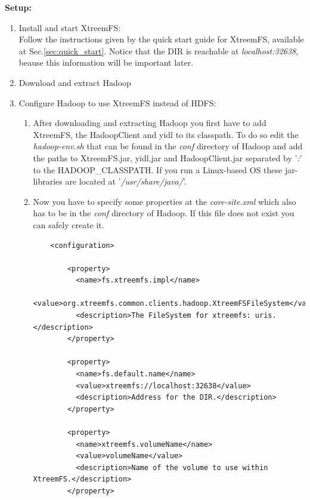\documentclass[a4paper,10pt]{book}
\begin{document}
\textbf{Setup:}
\begin{enumerate}
 \item Install and start XtreemFS:\\
	Follow the instructions given by the quick start guide for XtreemFS, available at Sec.\ref{sec:quick_start}. Notice 	
	that the DIR is reachable at \textit{localhost:32638}, beause this information will be important later.

\item Download and extract Hadoop

\item Configure Hadoop to use XtreemFS instead of HDFS:
	\begin{enumerate}
	\item After downloading and extracting Hadoop you first have to add XtreemFS, the HadoopClient and yidl to its 
	classpath. To do so edit the \textit{hadoop-env.sh} that can be found in the \textit{conf} directory of Hadoop and 
	add the paths to XtreemFS.jar, yidl.jar and HadoopClient.jar separated by '\textit{:}' to the HADOOP\_CLASSPATH. 
	If you run a Linux-based OS these jar-libraries are located at '\textit{/usr/share/java/}'.
	\item Now you have to specify some properties at the \textit{core-site.xml} which also has to be in the \textit{conf} 
	directory of Hadoop. If this file does not exist you can safely create it.
	\begin{verbatim}
	<configuration>

		<property>
		  <name>fs.xtreemfs.impl</name>
		  <value>org.xtreemfs.common.clients.hadoop.XtreemFSFileSystem</value>
		  <description>The FileSystem for xtreemfs: uris.</description>
		</property>

		<property>
		  <name>fs.default.name</name>
		  <value>xtreemfs://localhost:32638</value>
		  <description>Address for the DIR.</description>
		</property>

		<property>
		  <name>xtreemfs.volumeName</name>
		  <value>volumeName</value>
		  <description>Name of the volume to use within XtreemFS.</description>
		</property>


\end{verbatim}
\end{enumerate}
\end{enumerate}
\end{document}
